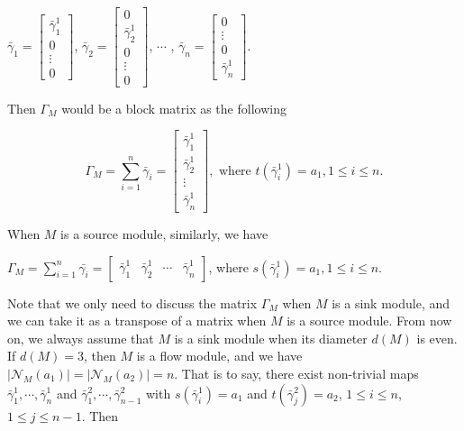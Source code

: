 \documentclass[a4paper,12pt]{amsart}
\newcommand{\bg}{\bar{\gamma}}
\newcommand{\cN}{\mathcal{N}}
\begin{document}
\begin{center}
$\bg_1= \begin{bmatrix}
\bg^1_1 \\ 
0\\
\vdots \\
0
\end{bmatrix}$, \quad $\bg_2= \begin{bmatrix}
0 \\ 
\bg^1_2\\
0\\
\vdots \\
0
\end{bmatrix} $, \quad $\cdots$ ,  \quad $\bg_n= \begin{bmatrix}
 
0\\
\vdots \\
0\\
\bg^1_n
\end{bmatrix} $. 
\end{center}
Then $\Gamma_M$ would be a block matrix as the following
 
 
\begin{center}
\begin{equation*}
\Gamma_M=\sum^{n}_{i=1}\bg_i=\begin{bmatrix}
\bar{\gamma}^1_{1}\\
\bar{\gamma}^1_{2}\\
\vdots \\
\bar{\gamma}^1_{n}
\end{bmatrix}, \text{ where }t(\bg^1_i)=a_1, 1\leq i\leq n.
\end{equation*}
\end{center} 
When $M$ is a source module, similarly, we have
\begin{center}
$\Gamma_M= \sum^{n}_{i=1}\bar{\gamma_i}=\begin{bmatrix}
\bar{\gamma}^1_{1} &  \bar{\gamma}^1_{2}& \cdots & \bar{\gamma}^1_{n}
\end{bmatrix}$, where $s(\bg^1_i)=a_1, 1\leq i\leq n$.
\end{center}
Note that we only need to discuss the matrix $\Gamma_M$ when $M$ is a sink  module,  and we  can  take it as a transpose of a matrix   when $M$ is a source module. From now on,  we always assume that $M$ is a sink module when its diameter $d(M)$ is even.  If $d(M)=3$, then $M$ is a flow module, and we have $\mid \cN_M(a_1)\mid=\mid \cN_M(a_2)\mid =n$. That is to say, there exist non-trivial maps $\bg^1_1,\cdots, \bg^1_n$ and $\bg^2_1,\cdots,\bg^2_{n-1}$ with $s(\bg^1_i)=a_1$ and $t(\bg^2_j)=a_2$, $1\leq i\leq n$, $1\leq j\leq n-1$. Then 
\end{document}

